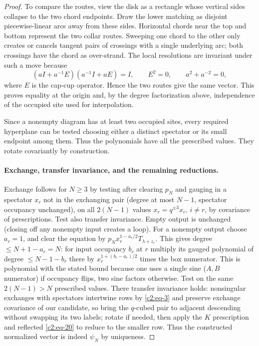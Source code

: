 \begin{proof}
To compare the routes, view the disk as a rectangle whose vertical sides
collapse to the two chord endpoints. Draw the lower matching as disjoint
piecewise-linear arcs away from these sides. Horizontal chords near the
top and bottom represent the two collar routes. Sweeping one chord to
the other only creates or cancels tangent pairs of crossings with a
single underlying arc; both crossings have the chord as over-strand.
The local resolutions are invariant under such a move because
\[
 (aI+a^{-1}E)(a^{-1}I+aE)=I,
 \qquad E^2=0,\qquad a^2+a^{-2}=0,
\]
where \(E\) is the cap-cup operator. Hence the two routes give the
same vector. This proves equality at the origin and, by the degree
factorization above, independence of the occupied site used for
interpolation.

Since a nonempty diagram has at least two occupied sites, every required hyperplane can be tested choosing either a distinct spectator or its small endpoint among them. Thus the polynomials have all the prescribed values. They rotate covariantly by construction.

\paragraph{Exchange, transfer invariance, and the remaining reductions.}
Exchange follows for \(N\ge3\) by testing after clearing \(p_N\) and gauging in a spectator \(x_r\) not in the exchanging pair (degree at most \(N-1\), spectator occupancy unchanged), on all \(2(N-1)\) values \(x_r=q^{\pm3}x_i,\ i\ne r\), by covariance of prescriptions. Test also transfer invariance. Empty output is unchanged (closing off any nonempty input creates a loop). For a nonempty output choose \(a_r=1\), and clear the equation by \(p_N x_r^{1-a_r/2} T_{\lambda+z_r}\). This gives degree \(\le N+1-a_r=N\): for input occupancy \(b_r\) at \(r\) multiply its gauged polynomial of degree \(\le N-1-b_r\) there by \(x_r^{1+(b_r-a_r)/2}\) times the box numerator. This is polynomial with the stated bound because one uses a single sine (\(A,B\) numerator) if occupancy flips, two sine factors otherwise. Test on the same \(2(N-1)>N\) prescribed values. There transfer invariance holds: nonsingular exchanges with spectators intertwine rows by \eqref{c2:eq-3} and preserve exchange covariance of our candidate, so bring the \(q\)-cubed pair to adjacent descending without swapping its two labels; rotate if needed, then apply the \(K\) prescription and reflected \eqref{c2:eq-20} to reduce to the smaller row. Thus the constructed normalized vector is indeed \(\psi_N\) by uniqueness.


\end{proof}
